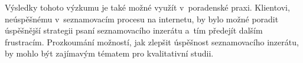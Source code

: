 \documentclass[a4paper, 12pt, notitlepage, oneside, numbers=noenddot]{report}
\begin{document}
Výsledky tohoto výzkumu je také možné využít v~poradenské praxi.
Klientovi, ne\-ús\-pě\-š\-nému v~seznamovacím procesu na internetu, by
bylo možné poradit úspěšnější strategii psaní seznamovacího inzerátu
a~tím předejít dalším frustracím.  Prozkoumání možností, jak zlepšit
úspěšnost seznamovacího inzerátu, by mohlo být zajímavým tématem pro
kvalitativní studii.

\clearpage
\singlespacing

%

\end{document}
